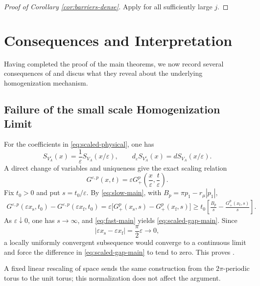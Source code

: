 \documentclass[11pt,reqno,noamsfonts]{amsart}
\theoremstyle{definition}
\theoremstyle{remark}
\begin{document}
\begin{proof}[Proof of Corollary \ref{cor:barriers-dense}]
Apply  for all sufficiently large $j$.
\end{proof}




\section{Consequences and Interpretation}\label{sec:consequences}
Having completed the proof of the main theorems, we now record several
consequences of  and discus what they reveal about
the underlying homogenization mechanism. 

\subsection{Failure of the small scale Homogenization Limit}

For the coefficients in \eqref{eq:scaled-physical}, one has
\[
  S_{V_A^\varepsilon}(x)
  =\frac1\varepsilon S_{V_A}(x/\varepsilon),
  \qquad
  d_\varepsilon S_{V_A^\varepsilon}(x)
  =dS_{V_A}(x/\varepsilon).
\]
A direct change of variables and uniqueness give the exact scaling
relation
\begin{equation*}
  G^{\varepsilon,p}(x,t)
  =\varepsilon
  G_+^p\left(\frac{x}{\varepsilon},
             \frac{t}{\varepsilon}\right).
\end{equation*}
Fix $t_0>0$ and put $s=t_0/\varepsilon$.  By
\eqref{eq:slow-main}, with
$B_p=\pi p_1-r_\mu|p_1|$,
\begin{align*}
G^{\varepsilon,p}(\varepsilon x_{\mathrm s},t_0)
-G^{\varepsilon,p}(\varepsilon x_{\mathrm f},t_0)=\varepsilon
  \bigl[G_+^p(x_{\mathrm s},s)-G_+^p(x_{\mathrm f},s)\bigr]
  \ge
  t_0\left[
    \frac{B_p}{s}-\frac{G_+^p(x_{\mathrm f},s)}s
  \right].
\end{align*}
As $\varepsilon\downarrow0$, one has $s\to\infty$, and
\eqref{eq:fast-main} yields
\eqref{eq:scaled-gap-main}.  Since
\[
  |\varepsilon x_{\mathrm s}-\varepsilon x_{\mathrm f}|
  =\frac\pi2\varepsilon
  \longrightarrow0,
\]
a locally uniformly convergent subsequence would converge to a
continuous limit and force the difference in
\eqref{eq:scaled-gap-main} to tend to zero.  This proves
.

A fixed linear rescaling of space sends the same construction from the
$2\pi$-periodic torus to the unit torus; this normalization does not
affect the argument.
\end{document}

